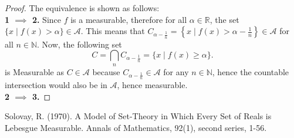 \documentclass{article}
\theoremstyle{definition}
\theoremstyle{remark}
\theoremstyle{definition}
\theoremstyle{definition}
\theoremstyle{definition}
\newcommand{\bintrs}{\bigcap}
\newcommand{\where}{\;\vert\;}
\newcommand{\R}{\mathbb{R}}
\newcommand{\N}{\mathbb{N}}
\newcommand{\alg}[1]{\mathscr{#1}}
\begin{document}
\begin{proof}
	The equivalence is shown as follows:\\
	\textbf{1 $ \implies $ 2.} Since $ f $ is a measurable, therefore for all $ \alpha \in \R $, the set $ \{x\where f(x) > \alpha\} \in \alg{A}$. This means that $ C_{\alpha - \frac{1}{n}} =\left \{x\where f(x) > \alpha - \frac{1}{n} \right \} \in \alg{A}$ for all $ n\in \N $. Now, the following set 
	\[C = \bintrs_{n} C_{\alpha - \frac{1}{n}} = \{x\where f(x) \ge \alpha\}.\]
	is Measurable as $ C \in \alg{A} $ because $ C_{\alpha - \frac{1}{n}} \in \alg{A}$ for any $ n\in \N $, hence the countable intersection would also be in $ \alg{A} $, hence measurable.\\
	\textbf{2 $ \implies $ 3.}
\end{proof}









\newpage
\begin{thebibliography}{9}
	Solovay, R. (1970). A Model of Set-Theory in Which Every Set of Reals is Lebesgue Measurable. Annals of Mathematics, 92(1), second series, 1-56.
\end{thebibliography}
\end{document}
